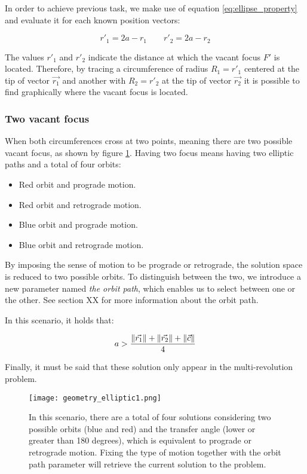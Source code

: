 In order to achieve previous task, we make use of equation
\ref{eq:ellipse_property} and evaluate it for each known position vectors:

\begin{equation}
  r'_{1} = 2a - r_{1}\quad\quad
  r'_{2} = 2a - r_{2}
\end{equation}

The values $r'_{1}$ and $r'_{2}$ indicate the distance at which the vacant focus
$F'$ is located. Therefore, by tracing a circumference of radius $R_{1} = r'_{1}$
centered at the tip of vector $\vec{r_{1}}$ and another with $R_{2} = r'_{2}$ at
the tip of vector $\vec{r_{2}}$ it is possible to find graphically where the
vacant focus is located.

\subsubsection{Two vacant focus}
When both circumferences cross at two points, meaning there are two possible
vacant focus, as shown by figure \ref{fig:elliptic_geometry_1}. Having two focus
means having two elliptic paths and a total of four orbits:

\begin{itemize}
  \item Red orbit and prograde motion.
  \item Red orbit and retrograde motion.
  \item Blue orbit and prograde motion.
  \item Blue orbit and retrograde motion.
\end{itemize}

By imposing the sense of motion to be prograde or retrograde, the solution space
is reduced to two possible orbits. To distinguish between the two, we introduce
a new parameter named \textit{the orbit path}, which enables us to select
between one or the other. See section XX for more information about the orbit
path.

In this scenario, it holds that:

\begin{equation}
  a > \frac{\lVert\vec{r_{1}}\rVert + \lVert\vec{r_{2}}\rVert + \lVert\vec{c}\rVert}{4}
\end{equation}

Finally, it must be said that these solution only appear in the
multi-revolution problem.

\begin{figure}[H]
  \centering
  \texttt{[image: geometry\_elliptic1.png]}
  \caption{
    In this scenario, there are a total of four solutions considering two
    possible orbits (blue and red) and the transfer angle (lower or greater than
    180 degrees), which is equivalent to prograde or retrograde motion. Fixing
    the type of motion together with the orbit path parameter will retrieve the
    current solution to the problem.
  }
  \label{fig:elliptic_geometry_1}
\end{figure}

